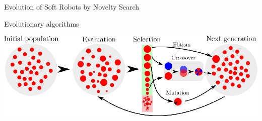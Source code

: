 \documentclass[6pt]{beamer}
\begin{document}
{

\begin{frame}{Evolution {\scriptsize of Soft Robots by Novelty Search}}
\begin{block}{Evolutionary algorithms}
\begin{center}
\includegraphics[width=1.0\textwidth]{../Figures/Misc/Evolution.eps}
\end{center}
\end{block}
\end{frame}

}
\end{document}
